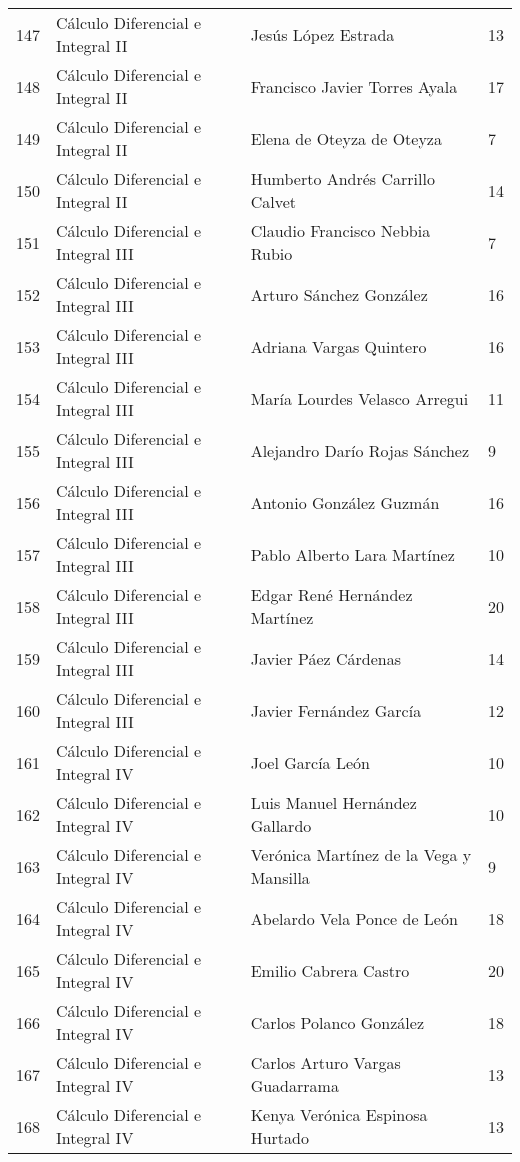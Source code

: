 \begin{table}[ht]
\begin{tabular}{rlll}
  147 & Cálculo Diferencial e Integral II & Jesús López Estrada & 13 \\ 
  148 & Cálculo Diferencial e Integral II & Francisco Javier Torres Ayala & 17 \\ 
  149 & Cálculo Diferencial e Integral II & Elena de Oteyza de Oteyza & 7 \\ 
  150 & Cálculo Diferencial e Integral II & Humberto Andrés Carrillo Calvet & 14 \\ 
  151 & Cálculo Diferencial e Integral III & Claudio Francisco Nebbia Rubio & 7 \\ 
  152 & Cálculo Diferencial e Integral III & Arturo Sánchez González & 16 \\ 
  153 & Cálculo Diferencial e Integral III & Adriana Vargas Quintero & 16 \\ 
  154 & Cálculo Diferencial e Integral III & María Lourdes Velasco Arregui & 11 \\ 
  155 & Cálculo Diferencial e Integral III & Alejandro Darío Rojas Sánchez & 9 \\ 
  156 & Cálculo Diferencial e Integral III & Antonio González Guzmán & 16 \\ 
  157 & Cálculo Diferencial e Integral III & Pablo Alberto Lara Martínez & 10 \\ 
  158 & Cálculo Diferencial e Integral III & Edgar René Hernández Martínez & 20 \\ 
  159 & Cálculo Diferencial e Integral III & Javier Páez Cárdenas & 14 \\ 
  160 & Cálculo Diferencial e Integral III & Javier Fernández García & 12 \\ 
  161 & Cálculo Diferencial e Integral IV & Joel García León & 10 \\ 
  162 & Cálculo Diferencial e Integral IV & Luis Manuel Hernández Gallardo & 10 \\ 
  163 & Cálculo Diferencial e Integral IV & Verónica Martínez de la Vega y Mansilla & 9 \\ 
  164 & Cálculo Diferencial e Integral IV & Abelardo Vela Ponce de León & 18 \\ 
  165 & Cálculo Diferencial e Integral IV & Emilio Cabrera Castro & 20 \\ 
  166 & Cálculo Diferencial e Integral IV & Carlos Polanco González & 18 \\ 
  167 & Cálculo Diferencial e Integral IV & Carlos Arturo Vargas Guadarrama & 13 \\ 
  168 & Cálculo Diferencial e Integral IV & Kenya Verónica Espinosa Hurtado & 13 \\ 

\end{tabular}
\end{table}
